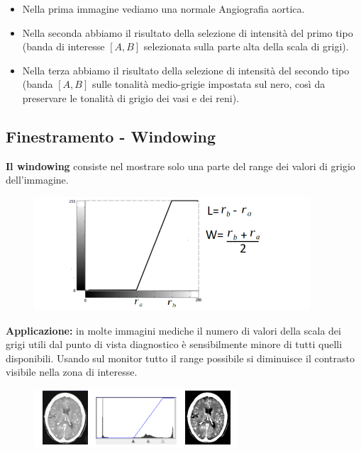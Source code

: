\begin{itemize}
    \item Nella prima immagine vediamo una normale Angiografia aortica.
    \item Nella seconda abbiamo il risultato della selezione di intensità del primo tipo (banda di
          interesse $[A, B]$ selezionata sulla parte alta della scala di grigi).
    \item Nella terza abbiamo il risultato della selezione di intensità del secondo tipo (banda
          $[A, B]$ sulle tonalità medio-grigie impostata sul nero, così da
          preservare le tonalità di grigio dei vasi e dei reni).
\end{itemize}

\subsection{Finestramento - Windowing}

\begin{definition}
    \textbf{Il windowing} consiste nel mostrare solo una parte del range dei valori di grigio dell'immagine.
\end{definition}

\begin{figure}[H]
    \centering
    \includegraphics[width=\linewidth, keepaspectratio]{capitoli/immagini/imgs/win1.png}
\end{figure}

\textbf{Applicazione:} in molte immagini mediche il numero di valori della
scala dei grigi utili dal punto di vista diagnostico è sensibilmente
minore di tutti quelli disponibili. Usando sul monitor tutto il range
possibile si diminuisce il contrasto visibile nella zona di interesse.

\begin{figure}[H]
    \centering
    \includegraphics[width=\linewidth, keepaspectratio]{capitoli/immagini/imgs/windowing.png}
\end{figure}

